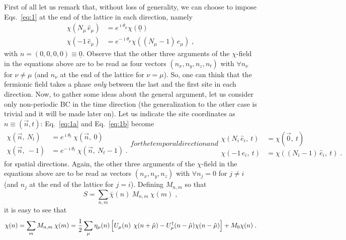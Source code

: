 \documentclass[a4paper,10pt]{article}
\newcommand{\Eq}[1]{Eq.~\eqref{eq:#1}}
\newcommand{\Eqs}[1]{Eqs.~\eqref{eq:#1}}
\begin{document}
First of all let us remark that, without loss of generality, we can choose to impose \Eqs{1}
at the end of the lattice in each direction, namely
\begin{equation}\label{eq:5}
  \begin{aligned}
    \chi(N_\mu\,\hat{e}_\mu)&=e^{\imath\theta_\mu}\chi(\underline{0}) \\
    \chi(-1\,\hat{e}_\mu)&=e^{-\imath\theta_\mu}\chi((N_\mu-1)\,\hat{e}_\mu) \;,
  \end{aligned}
\end{equation}
with $n=(0,0,0,0)\equiv\underline{0}$. Observe that the other three arguments of the $\chi$-field
in the equations above are to be read as four vectors $(n_x,n_y,n_z,n_t)$ with $\forall n_\nu$ for $\nu\neq\mu$
(and $n_\nu$ at the end of the lattice for $\nu=\mu$). So, one can think that the fermionic field takes a
phase \emph{only} between the last and the first site in each direction. Now, to gather some ideas
about the general argument, let us consider only non-periodic BC in the time direction (the generalization
to the other case is trivial and it will be made later on). Let us indicate the site coordinates as
$n\equiv(\vec{n},t)$: \Eq{1a} and \Eq{1b} become
\begin{subequations}\label{eq:6}
  \begin{equation}\label{eq:6a}
    \begin{aligned}
      \chi(\vec{n},\:N_t) &=e^{\imath\theta_t}\:\chi(\vec{n},\:0) \\
      \chi(\vec{n},\:-1)  &=e^{-\imath\theta_t}\:\chi(\vec{n},\:N_t-1) \;.
    \end{aligned}
  \end{equation}
for the temporal direction and
  \begin{equation}\label{eq:6b}
    \begin{aligned}
      \chi(N_i\,\hat{e}_i,\:t) &=\chi(\vec{0},\:t) \\
      \chi(-1\,\hat{e}_i,\:t)  &=\chi((N_i-1)\,\hat{e}_i,\:t) \;.
    \end{aligned}
  \end{equation}
\end{subequations}
for spatial directions. Again, the other three arguments of the $\chi$-field
in the equations above are to be read as vectors $(n_x,n_y,n_z)$ with $\forall n_j=0$ for $j\neq i$
(and $n_j$ at the end of the lattice for $j=i$). Defining $M_{n,m}$ so that
\[
 S=\sum_{n,m}\bar\chi(n)\:M_{n,m}\:\chi(m) \;,
\]
it is easy to see that
\begin{equation}\label{eq:7}
 \chi(n)=\sum_m M_{n,m}\:\chi(m)=\frac{1}{2}\sum_\mu \eta_\mu(n)\,\Bigl[U_\mu(n)^{\phantom{\dag}}\chi(n+\hat\mu)
					  -U^\dag_\mu(n-\hat\mu)\chi(n-\hat\mu)\Bigr]+M_0 \chi(n)\;.
\end{equation}
\end{document}
